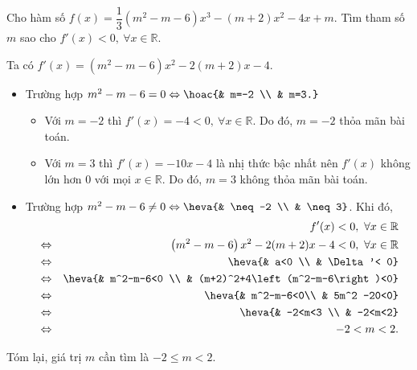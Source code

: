 \begin{bt}%
		Cho hàm số $f(x)=\dfrac{1}{3}\left(m^2-m-6\right)x^3-(m+2)x^2-4x+m$. Tìm tham số $m$ sao cho $f'(x)< 0,\ \forall x\in\mathbb{R}$.
		\loigiai
		{Ta có $f'(x)=\left(m^2-m-6\right)x^2-2(m+2)x-4$.\\
			\begin{itemize}
				\item Trường hợp $m^2-m-6=0\Leftrightarrow\hoac{& m=-2 \\ & m=3.}$
				\begin{itemize}
					\item Với $m=-2$ thì $f'(x)=-4<0,\ \forall x\in\mathbb{R}$. Do đó, $m=-2$ thỏa mãn bài toán.
					\item Với $m=3$ thì $f'(x)=-10x-4$ là nhị thức bậc nhất nên $f'(x)$ không lớn hơn $0$  với mọi $x\in\mathbb{R}$. Do đó, $m=3$ không thỏa mãn bài toán.
				\end{itemize}
				\item Trường hợp $m^2-m-6\neq 0\Leftrightarrow\heva{& \neq -2 \\ & \neq 3}$. Khi đó,
				\begin{eqnarray*}
					&& f'(x)< 0,\ \forall x\in\mathbb{R}\\
					&\Leftrightarrow & \left(m^2-m-6\right)x^2-2(m+2)x-4<0,\ \forall x\in\mathbb{R}\\
					&\Leftrightarrow &\heva{& a<0 \\ & \Delta'< 0}\\
					&\Leftrightarrow & \heva{& m^2-m-6<0 \\ & (m+2)^2+4\left(m^2-m-6\right)<0}\\
					&\Leftrightarrow & \heva{&  m^2-m-6<0\\ & 5m^2 -20<0}\\
					&\Leftrightarrow &\heva{& -2<m<3 \\ & -2<m<2}\\
					&\Leftrightarrow & -2< m< 2.
				\end{eqnarray*}
			\end{itemize}
			Tóm lại,  giá trị $m$ cần tìm là $-2\leq m<2$.
		}
	\end{bt}

